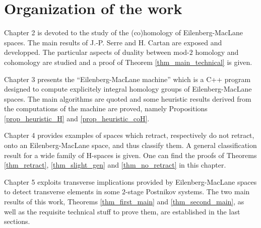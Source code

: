 \section{Organization of the work}

Chapter 2 is devoted to the study of the (co)homology of Eilenberg-MacLane spaces. The main results of J.-P. Serre \cite{Se53} and H. Cartan \cite{Ca55} are exposed and developped. The particular aspects of duality between mod-$2$ homology and cohomology are studied and a proof of Theorem \ref{thm_main_technical} is given.

\medskip
Chapter 3 presents the ``Eilenberg-MacLane machine'' which is a C++ program designed to compute explicitely integral homology groups of Eilenberg-MacLane spaces. The main algorithms are quoted and some heuristic results derived from the computations of the machine are proved, namely Propositions \ref{prop_heuristic_H} and \ref{prop_heuristic_coH}.

\medskip
Chapter 4 provides examples of spaces which retract, respectively do not retract, onto an Eilenberg-MacLane space, and thus classify them. A general classification result for a wide family of H-spaces is given. One can find the proofs of Theorems \ref{thm_retract}, \ref{thm_slight_gen} and \ref{thm_no_retract} in this chapter.

\medskip
Chapter 5 exploits transverse implications provided by Eilenberg-MacLane spaces to detect transverse elements in some $2$-stage Postnikov systems. The two main results of this work, Theorems \ref{thm_first_main} and \ref{thm_second_main}, as well as the requisite technical stuff to prove them, are established in the last sections.

\endinput
